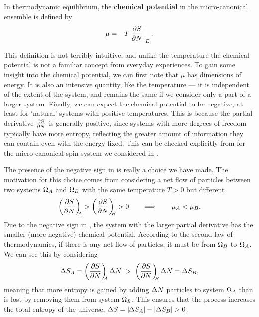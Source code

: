 \begin{shaded}
  In thermodynamic equilibrium, the \textbf{chemical potential} in the micro-canonical ensemble is defined by
  \begin{equation}
    \label{eq:chem_pot}
    \mu = -T \left. \frac{\partial S}{\partial N}\right|_E.
  \end{equation}
\end{shaded}

This definition is not terribly intuitive, and unlike the temperature the chemical potential is not a familiar concept from everyday experiences.
To gain some insight into the chemical potential, we can first note that $\mu$ has dimensions of energy. %
It is also an intensive quantity, like the temperature --- it is independent of the extent of the system, and remains the same if we consider only a part of a larger system.
Finally, we can expect the chemical potential to be negative, at least for `natural' systems with positive temperatures.
This is because the partial derivative $\frac{\partial S}{\partial N}$ is generally positive, since systems with more degrees of freedom typically have more entropy, reflecting the greater amount of information they can contain even with the energy fixed.
This can be checked explicitly from  for the micro-canonical spin system we considered in .

The presence of the negative sign in  is really a choice we have made.
The motivation for this choice comes from considering a net flow of particles between two systems $\Omega_A$ and $\Omega_B$ with the same temperature $T > 0$ but different
\begin{equation*}
  \left(\frac{\partial S}{\partial N}\right)_{\!\!\!A} > \left(\frac{\partial S}{\partial N}\right)_{\!\!\!B} > 0 \qquad \Longrightarrow \qquad \mu_A < \mu_B.
\end{equation*}
Due to the negative sign in , the system with the larger partial derivative has the smaller (more-negative) chemical potential.
According to the second law of thermodynamics, if there is any net flow of particles, it must be from $\Omega_B$ to $\Omega_A$.
We can see this by considering
\begin{equation*}
  \Delta S_A = \left(\frac{\partial S}{\partial N}\right)_{\!\!\!A} \Delta N \ > \ \left(\frac{\partial S}{\partial N}\right)_{\!\!\!B} \Delta N = \Delta S_B,
\end{equation*}
meaning that more entropy is gained by adding $\Delta N$ particles to system $\Omega_A$ than is lost by removing them from system $\Omega_B$.
This ensures that the process increases the total entropy of the universe, $\Delta S = |\Delta S_A| - |\Delta S_B| > 0$.

